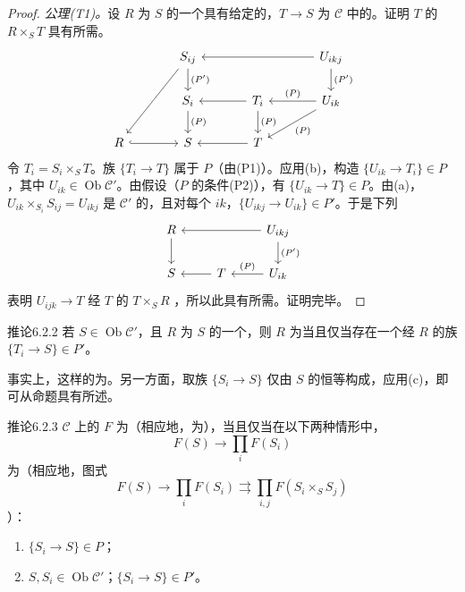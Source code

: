 \begin{proof}
\textit{公理(T1)。}设 $R$ 为 $S$ 的一个具有给定的，$T\to S$ 为 $\mathcal C$ 中的。证明 $T$ 的 $R\times_S T$ 具有所需。
\[
\begin{tikzcd}[column sep=large]
&S_{ij}\arrow[d,"(P')"]&&U_{ikj}\arrow[ll]\arrow[d,"(P')"]\\
&S_i\arrow[d,"(P)"]&T_i\arrow[l]\arrow[d,"(P)"]&U_{ik}\arrow[l,"(P)"']\arrow[dl,"(P)"]\\
R\arrow[r,hook]&S&T\arrow[l]&
\arrow[from=1-2,to=3-1]
\end{tikzcd}
\]
令 $T_i=S_i\times_S T$。族 $\{T_i\to T\}$ 属于 $P$（由(P1)）。应用(b)，构造 $\{U_{ik}\to T_i\}\in P$，其中 $U_{ik}\in\operatorname{Ob}\mathcal C'$。由假设（$P$ 的条件(P2)），有 $\{U_{ik}\to T\}\in P$。由(a)，$U_{ik}\times_{S_i}S_{ij}=U_{ikj}$ 是 $\mathcal C'$ 的，且对每个 $ik$，$\{U_{ikj}\to U_{ik}\}\in P'$。于是下列
\[
\begin{tikzcd}
R\arrow[d]&&U_{ikj}\arrow[ll]\arrow[d,"(P')"]\\
S&T\arrow[l]&U_{ik}\arrow[l,"(P)"']
\end{tikzcd}
\]
表明 $U_{ijk}\to T$ 经 $T$ 的 $T\times_S R$ ，所以此具有所需。证明完毕。
\end{proof}
\begin{SGAresult}{推论}{6.2.2}
若 $S\in\operatorname{Ob}\mathcal C'$，且 $R$ 为 $S$ 的一个，则 $R$ 为当且仅当存在一个经 $R$ 的族 $\{T_i\to S\}\in P'$。
\end{SGAresult}
事实上，这样的为。另一方面，取族 $\{S_i\to S\}$ 仅由 $S$ 的恒等构成，应用(c)，即可从命题具有所述。
\begin{SGAresult}{推论}{6.2.3}
$\mathcal C$ 上的 $F$ 为（相应地，为），当且仅当在以下两种情形中，
\[
F(S)\longrightarrow\prod_i F(S_i)
\]
为（相应地，图式
\[
F(S)\longrightarrow\prod_i F(S_i)\rightrightarrows\prod_{i,j}F(S_i\times_S S_j)
\]
）：
\begin{enumerate}
\item[(i)] $\{S_i\to S\}\in P$；
\item[(ii)] $S,S_i\in\operatorname{Ob}\mathcal C'$；$\{S_i\to S\}\in P'$。
\end{enumerate}
\end{SGAresult}
